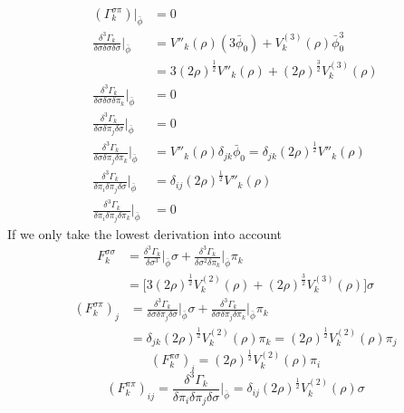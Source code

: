 \documentclass[UTF8]{article}
\begin{document}
\begin{equation}
\begin{split}
(\Gamma^{\sigma\pi}_k)\big|_{\bar{\phi}}&=0\\
\frac{\delta^3\Gamma_k}{\delta\sigma\delta\sigma\delta\sigma}\bigg|_{\bar{\phi}}&=V''_k(\rho)(3\bar{\phi}_0)+V^{(3)}_{k}(\rho)\bar{\phi}_0^3\\
&=3(2\rho)^{\frac{1}{2}}V''_k(\rho)+(2\rho)^{\frac{3}{2}}V^{(3)}_{k}(\rho)\\
\frac{\delta^3\Gamma_k}{\delta\sigma\delta\sigma\delta\pi_k}\bigg|_{\bar{\phi}}&=0\\
\frac{\delta^3\Gamma_k}{\delta\sigma\delta\pi_j\delta\sigma}\bigg|_{\bar{\phi}}&=0\\
\frac{\delta^3\Gamma_k}{\delta\sigma\delta\pi_j\delta\pi_k}\bigg|_{\bar{\phi}}&=V''_k(\rho)\delta_{jk}\bar{\phi}_0=\delta_{jk}(2\rho)^{\frac{1}{2}}V''_k(\rho)\\
\frac{\delta^3\Gamma_k}{\delta\pi_i\delta\pi_j\delta\sigma}\bigg|_{\bar{\phi}}&=\delta_{ij}(2\rho)^{\frac{1}{2}}V''_k(\rho)\\
\frac{\delta^3\Gamma_k}{\delta\pi_i\delta\pi_j\delta\pi_k}\bigg|_{\bar{\phi}}&=0
\end{split}
\end{equation}
If we only take the lowest derivation into account
\begin{equation}
\begin{split}
F^{\sigma\sigma}_k&=\frac{\delta^3\Gamma_k}{\delta\sigma^3}\bigg|_{\bar{\phi}}\sigma+\frac{\delta^3\Gamma_k}{\delta\sigma^2\delta\pi_k}\bigg|_{\bar{\phi}}\pi_k\\
&=\big[3(2\rho)^{\frac{1}{2}}V^{(2)}_k(\rho)+(2\rho)^{\frac{3}{2}}V^{(3)}_{k}(\rho)\big]\sigma
\end{split}
\end{equation}
\begin{equation}
\begin{split}
(F^{\sigma\pi}_k)_j&=\frac{\delta^3\Gamma_k}{\delta\sigma\delta\pi_j\delta\sigma}\bigg|_{\bar{\phi}}\sigma+\frac{\delta^3\Gamma_k}{\delta\sigma\delta\pi_j\delta\pi_k}\bigg|_{\bar{\phi}}\pi_k\\
&=\delta_{jk}(2\rho)^{\frac{1}{2}}V^{(2)}_k(\rho)\pi_k=(2\rho)^{\frac{1}{2}}V^{(2)}_{k}(\rho)\pi_j
\end{split}
\end{equation}
\begin{equation}
(F^{\pi\sigma}_k)_i=(2\rho)^{\frac{1}{2}}V^{(2)}_k(\rho)\pi_i
\end{equation}
\begin{equation}
(F^{\pi\pi}_k)_{ij}=\frac{\delta^3\Gamma_k}{\delta\pi_i\delta\pi_j\delta\sigma}\bigg|_{\bar{\phi}}=\delta_{ij}(2\rho)^{\frac{1}{2}}V^{(2)}_k(\rho)\sigma
\end{equation}
\end{document}

